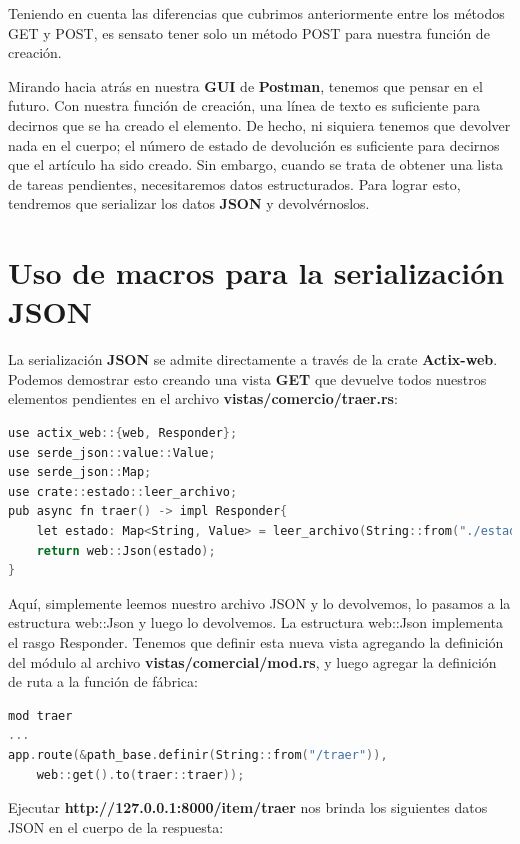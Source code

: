 Teniendo en cuenta las diferencias que cubrimos anteriormente entre los métodos GET y POST, es sensato tener solo un método POST para nuestra función de creación.

Mirando hacia atrás en nuestra \textbf{GUI} de \textbf{Postman}, tenemos que pensar en el futuro. Con nuestra función de creación, una línea de texto es suficiente para decirnos que se ha creado el elemento. De hecho, ni siquiera tenemos que devolver nada en el cuerpo; el número de estado de devolución es suficiente para decirnos que el artículo ha sido creado. Sin embargo, cuando se trata de obtener una lista de tareas pendientes, necesitaremos datos estructurados. Para lograr esto, tendremos que serializar los datos \textbf{JSON} y devolvérnoslos.

\section{Uso de macros para la serialización JSON}

La serialización \textbf{JSON} se admite directamente a través de la crate \textbf{Actix-web}. Podemos demostrar esto creando una vista \textbf{GET} que devuelve todos nuestros elementos pendientes en el archivo \textbf{vistas/comercio/traer.rs}:

\begin{lstlisting}[language=C]
use actix_web::{web, Responder};
use serde_json::value::Value;
use serde_json::Map;
use crate::estado::leer_archivo;
pub async fn traer() -> impl Responder{
	let estado: Map<String, Value> = leer_archivo(String::from("./estado.json"));
	return web::Json(estado);
}
\end{lstlisting}

Aquí, simplemente leemos nuestro archivo JSON y lo devolvemos, lo pasamos a la estructura web::Json y luego lo devolvemos. La estructura web::Json implementa el rasgo Responder. Tenemos que definir esta nueva vista agregando la definición del módulo al archivo \textbf{vistas/comercial/mod.rs}, y luego agregar la definición de ruta a la función de fábrica:


\begin{lstlisting}[language=C]
mod traer
...
app.route(&path_base.definir(String::from("/traer")),
	web::get().to(traer::traer));
\end{lstlisting}

Ejecutar \textbf{http://127.0.0.1:8000/item/traer} nos brinda los siguientes datos JSON en el cuerpo de la respuesta:

